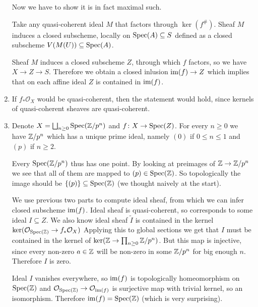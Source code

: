 \begin{exercise}{4}
\begin{enumerate}
{            Now we have to show it is in fact maximal such.

            Take any quasi-coherent ideal $M$ that factors through $\ker(f^\#)$.
            Sheaf $M$ induces a closed subscheme, locally on $\operatorname{Spec}(A) \subseteq
            S$ defined as a closed subscheme $V(M(U)) \subseteq \operatorname{Spec}(A)$.

            Sheaf $M$ induces a closed subscheme $Z$, through which $f$ factors,
            so we have $X \to Z \to S$. Therefore we obtain a closed inlusion $\operatorname{im}(f) \to
            Z$ which implies that on each affine ideal $Z$ is contained in
            $\operatorname{im}(f)$.
            }
        \item{
            If $f_* \mathcal{O}_X$ would be quasi-coherent, then the statement
            would hold, since kernels of quasi-coherent sheaves are
            quasi-coherent.

            }
        \item{
            Denote $X = \bigsqcup_{n \geq 0} \operatorname{Spec}(\mathbb{Z} / p^n)$ and $f \colon X
            \to \operatorname{Spec}(Z)$.
            For every $n \geq 0$ we have $\mathbb{Z}/p^n$ which has a unique prime
            ideal, namely $(0)$ if $0 \leq n \leq 1$ and $(p)$ if $n \geq 2$.

            Every $\operatorname{Spec}(\mathbb{Z}/p^n)$ thus has one point.
            By looking at preimages of $\mathbb{Z} \to \mathbb{Z} / p^n$ we see that
            all of them are mapped to $(p) \in \operatorname{Spec}(\mathbb{Z})$.
            So topologically the image should be $\{(p)\} \subseteq \operatorname{Spec}(\mathbb{Z})$
            (we thought naively at the start).

            We use previous two parts to compute ideal sheaf, from which we can
            infer closed subscheme $\operatorname{im}(f)$.
            Ideal sheaf is quasi-coherent, so corresponds to some ideal $I
            \subseteq Z$.
            We also know ideal sheaf $\tilde{I}$ is contained in the kernel
            $\ker(\mathcal{O}_{\operatorname{Spec}(\mathbb{Z})} \to f_* \mathcal{O}_X)$
            Applying this to global sections we get that $I$ must be
            contained in the kernel of $\ker(\mathbb{Z} \to \prod_{n \geq 0} \mathbb{Z} / p^n)$.
            But this map is injective, since every non-zero $a \in \mathbb{Z}$ will be non-zero
            in some $\mathbb{Z} / p^n$ for big enough $n$. Therefore $I$ is zero.

            Ideal $I$ vanishes everywhere, so $\operatorname{im}(f)$ is topologically
            homeomorphism on $\operatorname{Spec}(\mathbb{Z})$ and $\mathcal{O}_{\operatorname{Spec}(\mathbb{Z})} \to
            \mathcal{O}_{\operatorname{im}(f)}$ is surjective map with trivial kernel, so an
            isomorphism. Therefore $\operatorname{im}(f) = \operatorname{Spec}(\mathbb{Z})$ (which is very
            surprising).
            }
    \end{enumerate}

\end{exercise}


